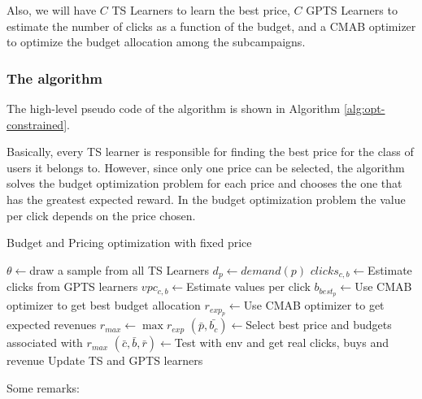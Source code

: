 Also, we will have $C$ TS Learners to learn the best price, $C$ GPTS Learners to estimate the number of clicks as a function of the budget, and a CMAB optimizer to optimize the budget allocation among the subcampaigns.

\subsubsection{The algorithm}
The high-level pseudo code of the algorithm is shown in Algorithm \ref{alg:opt-constrained}.

Basically, every TS learner is responsible for finding the best price for the class of users it belongs to.
However, since only one price can be selected, the algorithm solves the budget optimization problem for each price and chooses the one that has the greatest expected reward.
In the budget optimization problem the value per click depends on the price chosen.
\begin{algorithm}
    \caption{Budget and Pricing optimization with fixed price}
    \label{alg:opt-constrained}
	\begin{algorithmic}[1]
        \STATE $\theta\gets ${draw a sample from all TS Learners}
        \STATE $d_p \gets demand(p)$
        \STATE $clicks_{c,b} \gets${Estimate clicks from GPTS learners}
        \STATE $vpc_{c,b}\gets${Estimate values per click}
        \ENDFOR
        \ENDFOR
        \STATE $b_{best_p} \gets${Use CMAB optimizer to get best budget allocation}
        \STATE $r_{exp_p} \gets${Use CMAB optimizer to get expected revenues}
        \ENDFOR
        \STATE $r_{max} \gets \max{r_{exp}}$
        \STATE $(\bar{p}, \bar{b_c}) \gets${Select best price and budgets associated with $r_{max}$}
        \STATE $(\bar{c}, \bar{b}, \bar{r}) \gets${Test with env and get real clicks, buys and revenue}
        \STATE Update TS and GPTS learners
        \ENDFOR
        \ENDFOR
	\end{algorithmic}
\end{algorithm}
\newpage Some remarks:
